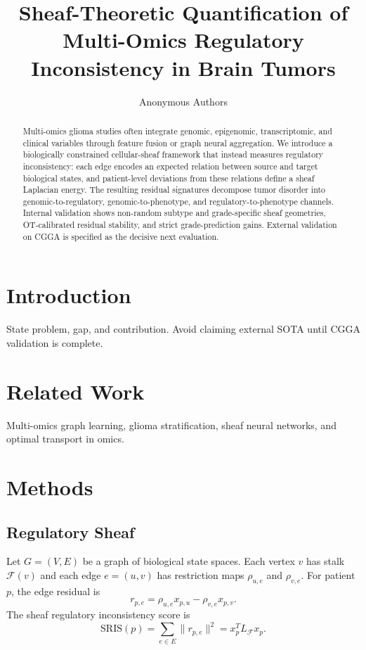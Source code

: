 \documentclass[conference]{IEEEtran}
\title{Sheaf-Theoretic Quantification of Multi-Omics Regulatory Inconsistency in Brain Tumors}
\author{Anonymous Authors}
\begin{document}
\maketitle
\begin{abstract}
Multi-omics glioma studies often integrate genomic, epigenomic, transcriptomic, and clinical variables through feature fusion or graph neural aggregation. We introduce a biologically constrained cellular-sheaf framework that instead measures regulatory inconsistency: each edge encodes an expected relation between source and target biological states, and patient-level deviations from these relations define a sheaf Laplacian energy. The resulting residual signatures decompose tumor disorder into genomic-to-regulatory, genomic-to-phenotype, and regulatory-to-phenotype channels. Internal validation shows non-random subtype and grade-specific sheaf geometries, OT-calibrated residual stability, and strict grade-prediction gains. External validation on CGGA is specified as the decisive next evaluation.
\end{abstract}
\section{Introduction}
State problem, gap, and contribution. Avoid claiming external SOTA until CGGA validation is complete.
\section{Related Work}
Multi-omics graph learning, glioma stratification, sheaf neural networks, and optimal transport in omics.
\section{Methods}
\subsection{Regulatory Sheaf}
Let $G=(V,E)$ be a graph of biological state spaces. Each vertex $v$ has stalk $\mathcal F(v)$ and each edge $e=(u,v)$ has restriction maps $\rho_{u,e}$ and $\rho_{v,e}$. For patient $p$, the edge residual is
\begin{equation}
r_{p,e}=\rho_{u,e}x_{p,u}-\rho_{v,e}x_{p,v}.
\end{equation}
The sheaf regulatory inconsistency score is
\begin{equation}
\mathrm{SRIS}(p)=\sum_{e\in E}\|r_{p,e}\|^2=x_p^T L_{\mathcal F}x_p.
\end{equation}
\end{document}
